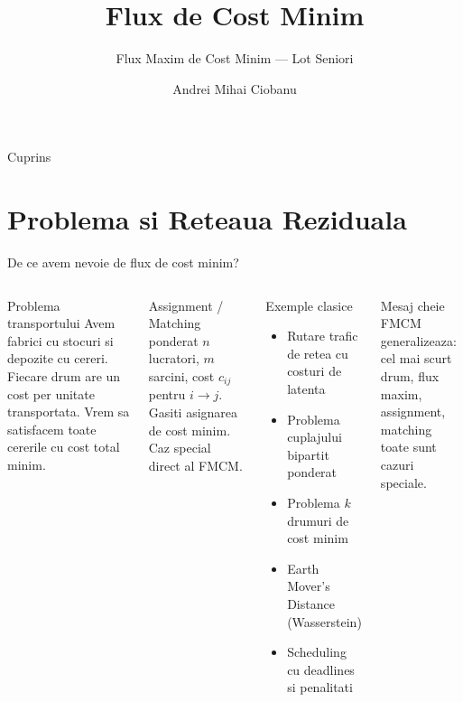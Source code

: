 ﻿\documentclass[9pt]{beamer}
\title{Flux de Cost Minim}
\subtitle{Flux Maxim de Cost Minim --- Lot Seniori}
\author{Andrei Mihai Ciobanu}
\institute{Algolymp Summer School}
\date{}
\begin{document}
\begin{frame}
  \titlepage
\end{frame}

\begin{frame}{Cuprins}
  \tableofcontents
\end{frame}

\section{Problema si Reteaua Reziduala}

\begin{frame}[shrink]{De ce avem nevoie de flux de cost minim?}
  \begin{columns}[T]
    \begin{block}{Problema transportului}
      Avem fabrici cu stocuri si depozite cu cereri.
      Fiecare drum are un \alert{cost per unitate transportata}.
      Vrem sa satisfacem toate cererile cu \alert{cost total minim}.
    \end{block}
    \smallskip
    \begin{block}{Assignment / Matching ponderat}
      $n$ lucratori, $m$ sarcini, cost $c_{ij}$ pentru $i \to j$.
      Gasiti asignarea de cost minim.
      Caz special direct al FMCM.
    \end{block}
    \begin{exampleblock}{Exemple clasice}
      \begin{footnotesize}
      \begin{itemize}
        \item Rutare trafic de retea cu costuri de latenta
        \item Problema cuplajului bipartit ponderat
        \item Problema $k$ drumuri de cost minim
        \item Earth Mover's Distance (Wasserstein)
        \item Scheduling cu deadlines si penalitati
      \end{itemize}
      \end{footnotesize}
    \end{exampleblock}
    \begin{alertblock}{Mesaj cheie}
      \footnotesize
      FMCM generalizeaza: cel mai scurt drum, flux maxim,
      assignment, matching \textemdash{} toate sunt cazuri speciale.
    \end{alertblock}
  \end{columns}
\end{frame}
\end{document}
